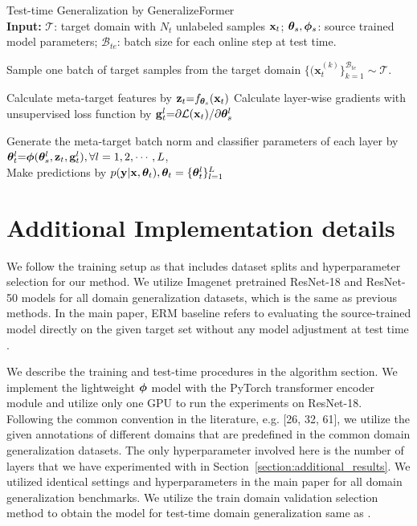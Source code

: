 \begin{algorithm}[ht!]
\small
\caption{Test-time Generalization by GeneralizeFormer \\
{\textbf{Input:}} $\mathcal{T}$: target domain with $N_t$  unlabeled samples ${\mathbf{x}_t}$; $\boldsymbol{\theta}_s, \boldsymbol{\phi}_s$: source trained model parameters;
$\mathcal{B}_{te}$: batch size for each online step at test time.
}
\label{alg:GF2}
\begin{algorithmic}[1]
\STATE Sample one batch of target samples from the target domain $\{(\mathbf{x}_{t}^{(k)}\}_{k=1}^{\mathcal{B}_{te}} \sim \mathcal{T}$.

\STATE Calculate meta-target features by $\mathbf{z}_{t} {=} f_{\boldsymbol{\theta}_{s}}(\mathbf{x}_{t})$
\STATE Calculate layer-wise gradients with unsupervised loss function by $\mathbf{g}_{t}^l {=} {\partial \mathcal{L} (\mathbf{x}_{t})} / {\partial \boldsymbol{\theta}^l_{s}}$

\STATE Generate the meta-target batch norm and classifier parameters of each layer by \\
$\boldsymbol{\theta}^l_{t} {=} \boldsymbol{\phi}(\boldsymbol{\theta}^l_{s}, \mathbf{z}_{t}, \mathbf{g}_{t}^l), \forall l=1,2,\cdots, L$, \\



\STATE Make predictions by $p(\mathbf{y}|\mathbf{x},\boldsymbol{\theta}_{t}), \boldsymbol{\theta}_{t} = \{ \boldsymbol{\theta}^l_{t} \}_{l=1}^L$
\ENDFOR
\end{algorithmic}
\end{algorithm}

\section{Additional Implementation details}
We follow the training setup as \cite{iwasawa2021test} that includes dataset splits and hyperparameter selection for our method. We utilize Imagenet pretrained ResNet-18 and ResNet-50 models for all domain generalization datasets, which is the same as previous methods. In the main paper, ERM baseline refers to evaluating the source-trained model directly on the given target set without any model adjustment at test time \cite{gulrajani2020search}. 

We describe the training and test-time procedures in the algorithm section. We implement the lightweight $\boldsymbol{\phi}$ model with the PyTorch transformer encoder module and utilize only one GPU to run the experiments on ResNet-18. {Following the common convention in the literature, e.g. [26, 32, 61], we utilize the given annotations of different domains that are predefined in the common domain generalization datasets. }The only hyperparameter involved here is the number of layers that we have experimented with in Section~\ref{section:additional_results}. We utilized identical settings and hyperparameters in the main paper for all domain generalization benchmarks. We utilize the train domain validation selection method to obtain the model for test-time domain generalization same as \cite{iwasawa2021test}. 


